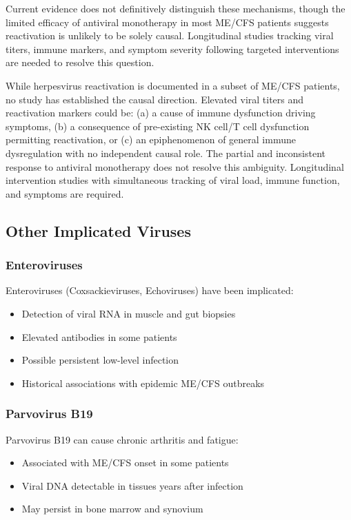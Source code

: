 Current evidence does not definitively distinguish these mechanisms, though the limited efficacy of antiviral monotherapy in most ME/CFS patients suggests reactivation is unlikely to be solely causal. Longitudinal studies tracking viral titers, immune markers, and symptom severity following targeted interventions are needed to resolve this question.

\begin{limitation}
While herpesvirus reactivation is documented in a subset of ME/CFS patients, no study has established the causal direction. Elevated viral titers and reactivation markers could be: (a) a cause of immune dysfunction driving symptoms, (b) a consequence of pre-existing NK cell/T cell dysfunction permitting reactivation, or (c) an epiphenomenon of general immune dysregulation with no independent causal role. The partial and inconsistent response to antiviral monotherapy does not resolve this ambiguity. Longitudinal intervention studies with simultaneous tracking of viral load, immune function, and symptoms are required.
\end{limitation}

\subsection{Other Implicated Viruses}
\label{sec:other-viruses}

\subsubsection{Enteroviruses}

Enteroviruses (Coxsackieviruses, Echoviruses) have been implicated:
\begin{itemize}
    \item Detection of viral RNA in muscle and gut biopsies
    \item Elevated antibodies in some patients
    \item Possible persistent low-level infection
    \item Historical associations with epidemic ME/CFS outbreaks
\end{itemize}

\subsubsection{Parvovirus B19}

Parvovirus B19 can cause chronic arthritis and fatigue:
\begin{itemize}
    \item Associated with ME/CFS onset in some patients
    \item Viral DNA detectable in tissues years after infection
    \item May persist in bone marrow and synovium
\end{itemize}

